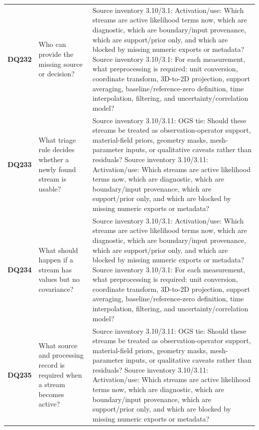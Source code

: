 \begin{longtable}{@{}L{0.09\textwidth} L{0.31\textwidth} L{0.52\textwidth}@{}}
\addlinespace[0.18em]
\textbf{DQ232} & Who can provide the missing source or decision? & Source inventory 3.10/3.1: Activation/use: Which streams are active likelihood terms now, which are diagnostic, which are boundary/input provenance, which are support/prior only, and which are blocked by missing numeric exports or metadata? Source inventory 3.10/3.1: For each measurement, what preprocessing is required: unit conversion, coordinate transform, 3D-to-2D projection, support averaging, baseline/reference-zero definition, time interpolation, filtering, and uncertainty/correlation model?\\
\addlinespace[0.18em]
\textbf{DQ233} & What triage rule decides whether a newly found stream is usable? & Source inventory 3.10/3.11: OGS tie: Should these streams be treated as observation-operator support, material-field priors, geometry masks, mesh-parameter inputs, or qualitative caveats rather than residuals? Source inventory 3.10/3.11: Activation/use: Which streams are active likelihood terms now, which are diagnostic, which are boundary/input provenance, which are support/prior only, and which are blocked by missing numeric exports or metadata?\\
\addlinespace[0.18em]
\textbf{DQ234} & What should happen if a stream has values but no covariance? & Source inventory 3.10/3.1: Activation/use: Which streams are active likelihood terms now, which are diagnostic, which are boundary/input provenance, which are support/prior only, and which are blocked by missing numeric exports or metadata? Source inventory 3.10/3.1: For each measurement, what preprocessing is required: unit conversion, coordinate transform, 3D-to-2D projection, support averaging, baseline/reference-zero definition, time interpolation, filtering, and uncertainty/correlation model?\\
\addlinespace[0.18em]
\textbf{DQ235} & What source and processing record is required when a stream becomes active? & Source inventory 3.10/3.11: OGS tie: Should these streams be treated as observation-operator support, material-field priors, geometry masks, mesh-parameter inputs, or qualitative caveats rather than residuals? Source inventory 3.10/3.11: Activation/use: Which streams are active likelihood terms now, which are diagnostic, which are boundary/input provenance, which are support/prior only, and which are blocked by missing numeric exports or metadata?\\
\end{longtable}
\footnotesize

\normalsize
\fi
